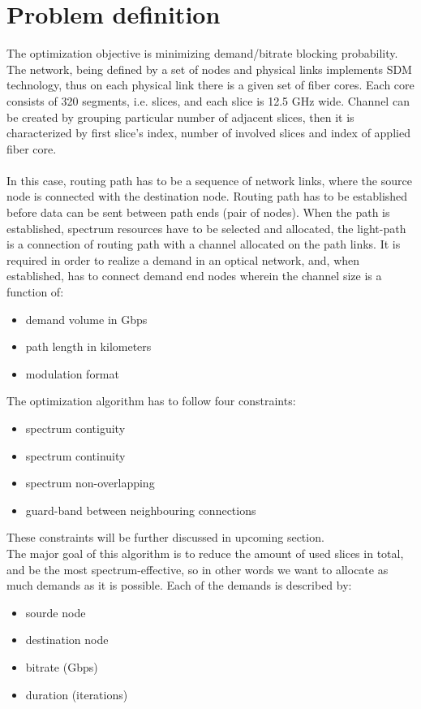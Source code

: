\documentclass[conference]{IEEEtran}
\begin{document}
\section{Problem definition}
The optimization objective is minimizing demand/bitrate blocking probability. The network, being defined by a set of nodes and physical links implements SDM technology, thus on each physical link there is a given set of fiber cores. Each core consists of 320 segments, i.e. slices, and each slice is 12.5 GHz wide. Channel can be created by grouping particular number of adjacent slices, then it is characterized by first slice's index, number of involved slices and index of applied fiber core.
\\ \\
In this case, routing path has to be a sequence of network links, where the source node is connected with the destination node. Routing path has to be established before data can be sent between path ends (pair of nodes). When the path is established, spectrum resources have to be selected and allocated, the light-path is a connection of routing path with a channel allocated on the path links. It is required in order to realize a demand in an optical network, and, when established, has to connect demand end nodes wherein the channel size is a function of:
\begin{itemize}
\item demand volume in Gbps
\item path length in kilometers
\item modulation format
\end{itemize}
The optimization algorithm has to follow four constraints:
\begin{itemize}
\item spectrum contiguity
\item spectrum continuity
\item spectrum non-overlapping
\item guard-band between neighbouring connections
\end{itemize}
These constraints will be further discussed in upcoming section.
\\
The major goal of this algorithm is to reduce the amount of used slices in total, and be the most spectrum-effective, so in other words we want to allocate as much demands as it is possible. Each of the demands is described by:
\begin{itemize}
\item sourde node
\item destination node
\item bitrate (Gbps)
\item duration (iterations)
\end{itemize}
\end{document}
